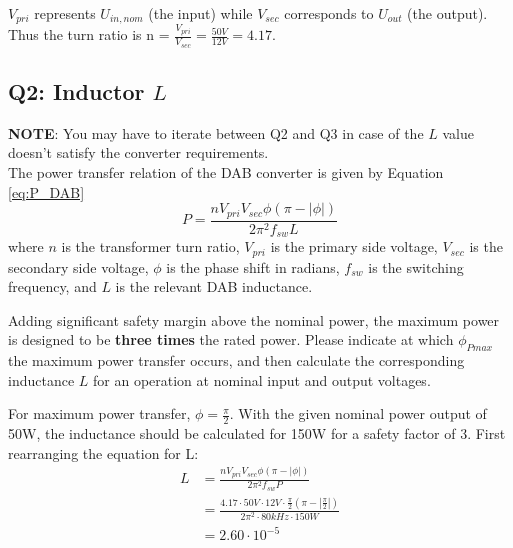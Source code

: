 \documentclass{PELsmallreport}
\begin{document}
    \begin{framed}
      \vspace{2em}
    	$V_{pri}$ represents $U_{in,nom}$ (the input) while $V_{sec}$ corresponds to $U_{out}$ (the output). Thus the turn ratio is n = $\frac{V_{pri}}{V_{sec}} = \frac{50 V}{12 V} = 4.17$.
    	\vspace{2em}
    \end{framed}
    
     \quad 
    \hfill{}

\subsection{Q2: Inductor $L$}
    \textbf{NOTE}: You may have to iterate between Q2 and Q3 in case of the $L$ value doesn't satisfy the converter requirements.\\

    The power transfer relation of the DAB converter is given by Equation \ref{eq:P_DAB}
\begin{equation}
    P = \frac{n V_{pri} V_{sec}\phi ( \pi-|\phi| ) }{2\pi^2f_{sw}L}
    \label{eq:P_DAB}
\end{equation}
    where $n$ is the transformer turn ratio, $V_{pri}$ is the primary side voltage, $V_{sec}$ is the secondary side voltage, $\phi$ is the phase shift in radians, $f_{sw}$ is the switching frequency, and $L$ is the relevant DAB inductance.

    Adding significant safety margin above the nominal power, the maximum power is designed to be \textbf{three times} the rated power. Please indicate at which $\phi_{Pmax}$ the maximum power transfer occurs, and then calculate the corresponding inductance $L$ for an operation at nominal input and output voltages.

    \begin{framed}
      \vspace{1em}
    	For maximum power transfer, $\phi = \frac{\pi}{2}$. With the given nominal power output of 50W, the inductance should be calculated for 150W for a safety factor of 3. First rearranging the equation for L:
        \begin{align}
            L &= \frac{n V_{pri} V_{sec}\phi ( \pi-|\phi| ) }{2\pi^2f_{sw}P} \\
            &= \frac{4.17 \cdot 50V \cdot 12V \cdot \frac{\pi}{2}( \pi-|\frac{\pi}{2}| ) }{2\pi^2\cdot 80kHz \cdot 150W} \\
            &= 2.60 \cdot 10^{-5}
        \end{align}
    \end{framed}
    
\end{document}
